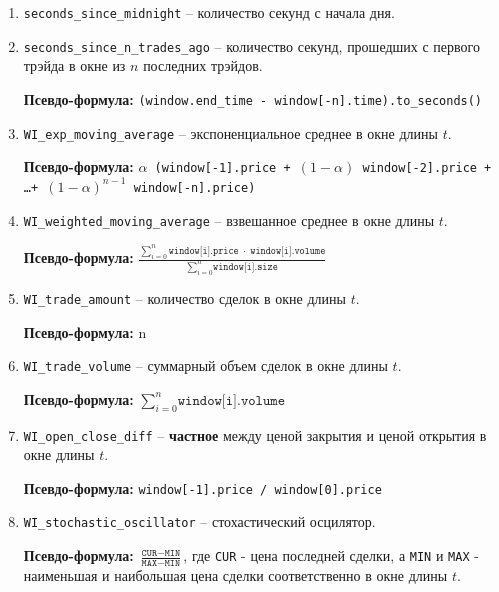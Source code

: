 \begin{enumerate}
    \item \texttt{seconds\_since\_midnight} -- количество секунд с начала дня.
    \item \texttt{seconds\_since\_n\_trades\_ago} -- количество секунд, прошедших с первого трэйда в окне из $n$ последних трэйдов.

    \textbf{Псевдо-формула:} \texttt{(window.end\_time - window[-n].time).to\_seconds()}

    \item \texttt{WI\_exp\_moving\_average} -- экспоненциальное среднее в окне длины $t$. 

    \textbf{Псевдо-формула:} \texttt{$\alpha$ (window[-1].price + $(1 - \alpha)$ window[-2].price + \dots + $(1 - \alpha)^{n - 1}$ window[-n].price)}

    \item \texttt{WI\_weighted\_moving\_average} -- взвешанное среднее в окне длины $t$.

    \textbf{Псевдо-формула:} $\frac{\sum\limits_{i=0}^{n} \texttt{window[i].price} \; \cdot \; \texttt{window[i].volume}}{\sum\limits_{i=0}^{n}\texttt{window[i].size}}$

    \item \texttt{WI\_trade\_amount} -- количество сделок в окне длины $t$.

    \textbf{Псевдо-формула:} n

    \item \texttt{WI\_trade\_volume} -- суммарный объем сделок в окне длины $t$.

    \textbf{Псевдо-формула:} $\sum\limits_{i=0}^{n}\texttt{window[i].volume}$

    \item \texttt{WI\_open\_close\_diff} -- \textbf{частное} между ценой закрытия и ценой открытия в окне длины $t$.

    \textbf{Псевдо-формула:} \texttt{window[-1].price / window[0].price}

    \item \texttt{WI\_stochastic\_oscillator} -- стохастический осцилятор.

    \textbf{Псевдо-формула:} $\frac{\texttt{CUR} - \texttt{MIN}}{\texttt{MAX} - \texttt{MIN}}$, где \texttt{CUR} - цена последней сделки, а \texttt{MIN} и \texttt{MAX} - наименьшая и наибольшая цена сделки соответственно в окне длины $t$.

\end{enumerate}

